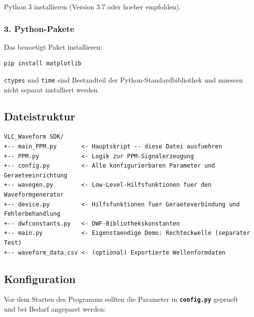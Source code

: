 Python 3 installieren (Version 3.7 oder hoeher empfohlen).

\subsubsection*{3. Python-Pakete}

Das benoetigt Paket installieren:

\begin{lstlisting}[language=bash]
pip install matplotlib
\end{lstlisting}

\texttt{ctypes} und \texttt{time} sind Bestandteil der Python-Standardbibliothek
und muessen nicht separat installiert werden.

\subsection*{Dateistruktur}

\begin{lstlisting}
VLC_Waveform SDK/
+-- main_PPM.py       <- Hauptskript -- diese Datei ausfuehren
+-- PPM.py            <- Logik zur PPM-Signalerzeugung
+-- config.py         <- Alle konfigurierbaren Parameter und Geraeteeinrichtung
+-- wavegen.py        <- Low-Level-Hilfsfunktionen fuer den Waveformgenerator
+-- device.py         <- Hilfsfunktionen fuer Geraeteverbindung und Fehlerbehandlung
+-- dwfconstants.py   <- DWF-Bibliothekskonstanten
+-- main.py           <- Eigenstaendige Demo: Rechteckwelle (separater Test)
+-- waveform_data.csv <- (optional) Exportierte Wellenformdaten
\end{lstlisting}

\subsection*{Konfiguration}

Vor dem Starten des Programms sollten die Parameter in \textbf{\texttt{config.py}}
geprueft und bei Bedarf angepasst werden:

